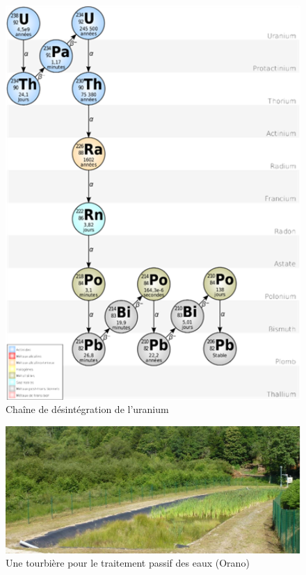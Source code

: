 \documentclass{article}
\begin{document}


\begin{figure}[H]
    \centering
    \includegraphics[width=13cm]{II_A2_1.png}
    \caption{Chaîne de désintégration de l’uranium}
    \label{fig:desintegration_uranium}
\end{figure}
\newpage

\begin{figure}[H]
\centering
\includegraphics[width=0.65\linewidth]{III_A_4.png}
\caption{Une tourbière pour le traitement passif des eaux (Orano)}
\label{fig:tourbiere}
\end{figure}
\end{document}
